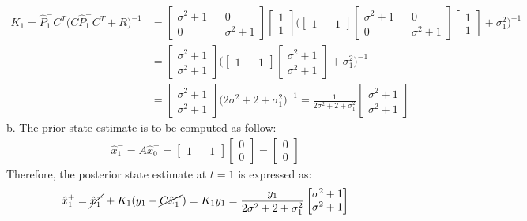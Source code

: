 \begin{align*}
    K_1
    =\hat{P}_1^-C^T\bigl(C\hat{P}_1^-C^T+R\bigr)^{-1}
    &=
    \begin{bmatrix}
        \sigma^2+1&&0\\0&&\sigma^2+1
    \end{bmatrix}
    \begin{bmatrix}
        1\\1
    \end{bmatrix}
    \Biggl(
        \begin{bmatrix}
            1&&1
        \end{bmatrix}
        \begin{bmatrix}
            \sigma^2+1&&0\\0&&\sigma^2+1
        \end{bmatrix}
        \begin{bmatrix}
            1\\1
        \end{bmatrix}
        +\sigma_1^2
    \Biggr)^{-1}\\
    &=
    \begin{bmatrix}
        \sigma^2+1\\\sigma^2+1
    \end{bmatrix}
    \Biggl(
        \begin{bmatrix}
            1&&1
        \end{bmatrix}
        \begin{bmatrix}
            \sigma^2+1\\\sigma^2+1
        \end{bmatrix}
        +\sigma_1^2
    \Biggr)^{-1}\\
    &=
    \begin{bmatrix}
        \sigma^2+1\\\sigma^2+1
    \end{bmatrix}
    \bigl(2\sigma^2+2+\sigma_1^2\bigr)^{-1}
    =
    \frac{1}{2\sigma^2+2+\sigma_1^2}
    \begin{bmatrix}
        \sigma^2+1\\\sigma^2+1
    \end{bmatrix}
\end{align*}
b. The prior state estimate is to be computed as follow:
\begin{align*}
    \hat{x}_1^-
    =A\hat{x}_0^+
    =
    \begin{bmatrix}
        1&&1
    \end{bmatrix}
    \begin{bmatrix}
        0\\0
    \end{bmatrix}
    =
    \begin{bmatrix}
        0\\0
    \end{bmatrix}
\end{align*}
Therefore, the posterior state estimate at \(t=1\) is expressed as:
\begin{align*}
    \hat{x}_1^+
    =\cancel{\hat{x}_1^-}+K_1(y_1-\cancel{C\hat{x}_1^-})
    =K_1y_1
    =
    \frac{y_1}{2\sigma^2+2+\sigma_1^2}
    \begin{bmatrix}
        \sigma^2+1\\\sigma^2+1
    \end{bmatrix}
\end{align*}
